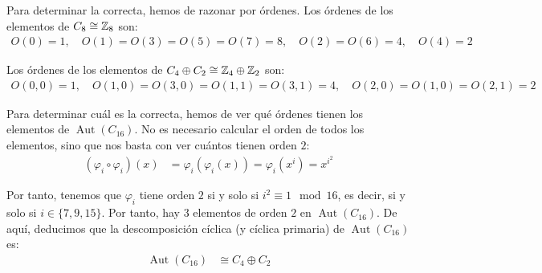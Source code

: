 \documentclass[12pt]{article}
\DeclareMathOperator{\Aut}{Aut}
\begin{document}
\begin{ejercicio}
\begin{enumerate}
            Para determinar la correcta, hemos de razonar por órdenes. Los órdenes de los elementos de $C_8\cong \mathbb{Z}_8$ son:
            \begin{gather*}
                O(0)=1,\quad
                O(1)=O(3)=O(5)=O(7)=8,\quad
                O(2)=O(6)=4,\quad
                O(4)=2
            \end{gather*}

            Los órdenes de los elementos de $C_4\oplus C_2\cong \mathbb{Z}_4\oplus \mathbb{Z}_2$ son:
            \begin{gather*}
                O(0,0)=1,\quad
                O(1,0)=O(3,0)=O(1,1)=O(3,1)=4,\quad
                O(2,0)=O(1,0)=O(2,1)=2
            \end{gather*}

            Para determinar cuál es la correcta, hemos de ver qué órdenes tienen los elementos de $\Aut(C_{16})$. No es necesario calcular el orden de todos los elementos, sino que nos basta con ver cuántos tienen orden $2$:
            \begin{align*}
                (\varphi_i \circ \varphi_i)(x) & = \varphi_i(\varphi_i(x)) = \varphi_i(x^i) = x^{i^2}
            \end{align*}

            Por tanto, tenemos que $\varphi_i$ tiene orden $2$ si y solo si $i^2 \equiv 1 \mod 16$, es decir, si y solo si $i\in \{7,9,15\}$. Por tanto, hay $3$ elementos de orden $2$ en $\Aut(C_{16})$. De aquí, deducimos que la descomposición cíclica (y cíclica primaria) de $\Aut(C_{16})$ es:
            \begin{align*}
                \Aut(C_{16}) & \cong C_4 \oplus C_2
            \end{align*}

        \end{enumerate}
    \end{ejercicio}
\end{document}
